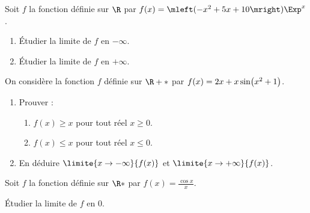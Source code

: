 %
%
%
\begin{mth}Soit $f$ la fonction définie sur $\R$ par $f(x)=\mleft(-x^2+5x+10\mright)\Exp^{x}$.
	\begin{enumerate}
	\item \'Etudier la limite de $f$ en $-\infty$.
	\item \'Etudier la limite de $f$ en $+\infty$.
	\end{enumerate}
\end{mth}
%
%
%
\begin{mth}On considère la fonction $f$ définie sur $\R+*$ par $f(x)=2x+x\sin \mleft(x^2+1\mright)$.
	\begin{enumerate}
	\item Prouver : 
		\begin{enumerate}
		\item $f(x)\geqslant x$ pour tout réel $x\geqslant 0$.
		\item $f(x)\leqslant x$ pour tout réel $x\leqslant 0$.
		\end{enumerate}
	\item En déduire $\limite{x\to-\infty}{f(x)}$ et  $\limite{x\to+\infty}{f(x)}$.
	\end{enumerate}
\end{mth}
%
%
%
\begin{mth}Soit $f$ la fonction définie sur $\R*$ par $f(x)=\frac{\cos x}{x}$.

\'Etudier la limite de $f$ en $0$.
\end{mth}
%
%
%
\endinput

\begin{mth} Soit $f$ la fonction définie sur $\Retoile$ par $f(x)=\frac{x^2+x}{x^2}$.

Prouver que la droite $(d)$ d'équation $y=1$ est asymptote horizontale à $\crbf$ au voisinage de $+\infty$.
\end{mth}

